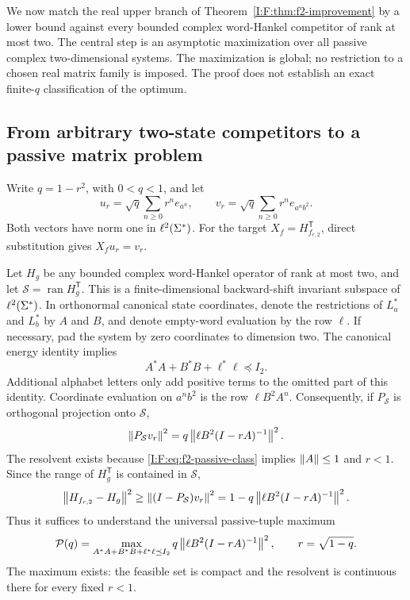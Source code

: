 We now match the real upper branch of
Theorem~\ref{I:F:thm:f2-improvement} by a lower bound against every bounded
complex word-Hankel competitor of rank at most two.  The central step is
an asymptotic maximization over all passive complex two-dimensional
systems.  The maximization is global; no restriction to a chosen real
matrix family is imposed.  The proof does not establish an exact
finite-$q$ classification of the optimum.

\subsection{From arbitrary two-state competitors to a passive matrix problem}

Write $q=1-r^2$, with $0<q<1$, and let
\begin{equation}
 u_r=\sqrt q\sum_{n\ge0}r^n e_{a^n},\qquad
 v_r=\sqrt q\sum_{n\ge0}r^n e_{a^n b^2}.
 \label{I:F:eq:f2-test-vectors}
\end{equation}
Both vectors have norm one in $\ell^2(\Sigma^*)$.  For the target
$X_f=H_{f_{r,2}}^{\mathsf T}$, direct substitution gives
$X_fu_r=v_r$.

Let $H_g$ be any bounded complex word-Hankel operator of rank at most
two, and let $\mathcal S=\operatorname{ran}H_g^{\mathsf T}$.
This is a finite-dimensional backward-shift invariant subspace of
$\ell^2(\Sigma^*)$.  In orthonormal canonical state coordinates, denote the
restrictions of $L_a^*$ and $L_b^*$ by $A$ and $B$, and denote
empty-word evaluation by the row $\ell$.  If necessary, pad the system
by zero coordinates to dimension two.  The canonical energy identity
implies
\begin{equation}
 A^*A+B^*B+\ell^*\ell\preceq I_2.
 \label{I:F:eq:f2-passive-class}
\end{equation}
Additional alphabet letters only add positive terms to the omitted part
of this identity.  Coordinate evaluation on $a^n b^2$ is the row
$\ell B^2A^n$.  Consequently, if $P_{\mathcal S}$ is orthogonal
projection onto $\mathcal S$,
\begin{equation}
 \left\lVert P_{\mathcal S}v_r\right\rVert^2
   =q\left\lVert\ell B^2(I-rA)^{-1}\right\rVert^2.
 \label{I:F:eq:f2-projection-passive}
\end{equation}
The resolvent exists because \eqref{I:F:eq:f2-passive-class} implies
$\left\lVert A\right\rVert\le1$ and $r<1$.  Since the range of $H_g^{\mathsf T}$ is
contained in $\mathcal S$,
\begin{equation}
 \left\lVert H_{f_{r,2}}-H_g\right\rVert^2
 \ge \left\lVert(I-P_{\mathcal S})v_r\right\rVert^2
 =1-q\left\lVert\ell B^2(I-rA)^{-1}\right\rVert^2.
 \label{I:F:eq:f2-competitor-lower}
\end{equation}
Thus it suffices to understand the universal passive-tuple maximum
\begin{equation}
 \mathcal P(q)=
 \max_{A^*A+B^*B+\ell^*\ell\preceq I_2}
 q\left\lVert\ell B^2(I-rA)^{-1}\right\rVert^2,
 \qquad r=\sqrt{1-q}.
 \label{I:F:eq:f2-P-definition}
\end{equation}
The maximum exists: the feasible set is compact and the resolvent is
continuous there for every fixed $r<1$.

